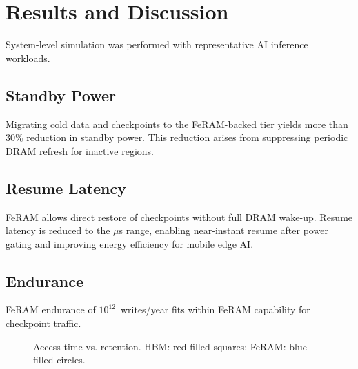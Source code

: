 \section{Results and Discussion}
System-level simulation was performed with representative AI inference workloads.

\subsection{Standby Power}
Migrating cold data and checkpoints to the FeRAM-backed tier yields more than 30\% reduction in standby power.
This reduction arises from suppressing periodic DRAM refresh for inactive regions.

\subsection{Resume Latency}
FeRAM allows direct restore of checkpoints without full DRAM wake-up.
Resume latency is reduced to the $\mu$s range, enabling near-instant resume after power gating and improving energy efficiency for mobile edge AI.

\subsection{Endurance}
FeRAM endurance of $10^{12}$~writes/year fits within FeRAM capability for checkpoint traffic.

\begin{figure*}[!t]
\centering
{}
\caption{Access time vs. retention. HBM: red filled squares; FeRAM: blue filled circles.}
\label{fig:retention_access}
\end{figure*}
